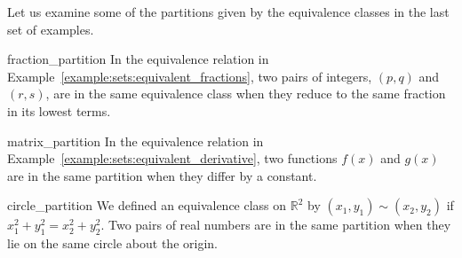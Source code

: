 Let us examine some of the partitions given by the equivalence classes in the last set of examples. 

\medskip
 
\begin{example}{fraction_partition}
In the equivalence relation in Example~\ref{example:sets:equivalent_fractions}, two pairs of integers, $(p,q)$ and $(r,s)$, are in the same equivalence class when they reduce to the same fraction in its lowest terms.  
\end{example}
 
\begin{example}{matrix_partition}
In the equivalence relation in Example~\ref{example:sets:equivalent_derivative}, two functions $f(x)$ and $g(x)$ are in the same partition when they differ by a constant.  
\end{example}

\begin{example}{circle_partition}
We defined an equivalence class on ${\mathbb R}^2$ by $(x_1, y_1 ) \sim (x_2, y_2)$ if $x_1^2 + y_1^2 = x_2^2 + y_2^2$.  Two pairs of real numbers are in the same partition when they lie on the same circle about the origin. 
\end{example}
 
